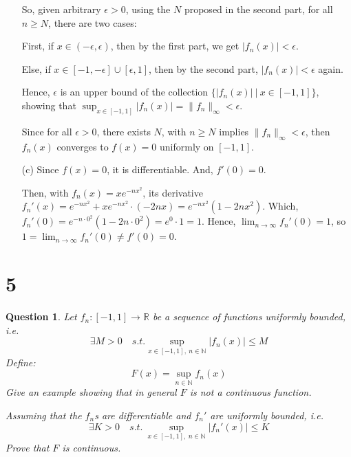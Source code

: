 \documentclass{article}
\newtheorem{question}{Question}
\begin{document}
\begin{itemize}
    \hfill

    So, given arbitrary $\epsilon>0$, using the $N$ proposed in the second part, for all $n\geq N$, there are two cases:

    First, if $x\in (-\epsilon,\epsilon)$, then by the first part, we get $|f_n(x)|<\epsilon$.

    Else, if $x\in [-1,-\epsilon]\cup[\epsilon,1]$, then by the second part, $|f_n(x)|<\epsilon$ again.

    Hence, $\epsilon$ is an upper bound of the collection $\{|f_n(x)|\ |\ x\in [-1,1]\}$, showing that $\sup_{x\in[-1,1]}|f_n(x)|=\|f_n\|_\infty<\epsilon$.

    Since for all $\epsilon>0$, there exists $N$, with $n\geq N$ implies $\|f_n\|_\infty<\epsilon$, then $f_n(x)$ converges to $f(x)=0$ uniformly on $[-1,1]$.
    
    \hfill

    \item[(c)] Since $f(x)=0$, it is differentiable. And, $f'(0)=0$.
    
    Then, with $f_n(x)=xe^{-nx^2}$, its derivative $f_n'(x)=e^{-nx^2}+xe^{-nx^2}\cdot(-2nx) = e^{-nx^2}(1-2nx^2)$.
    Which, $f_n'(0) = e^{-n\cdot 0^2}(1-2n\cdot 0^2) = e^0\cdot 1 = 1$. Hence, $\lim_{n\rightarrow\infty}f_n'(0)=1$, 
    so $1 = \lim_{n\rightarrow\infty}f_n'(0) \neq f'(0) = 0$.
\end{itemize}

\hfill

\hfill

\section*{5}
\begin{myBox}[]{}
    \begin{question}
        Let $f_n:[-1,1]\rightarrow\mathbb{R}$ be a sequence of functions uniformly bounded, i.e.
        $$\exists M>0\quad s.t. \sup_{x\in [-1,1],\ n\in\mathbb{N}}|f_n(x)| \leq M$$
        Define:
        $$F(x)=\sup_{n\in\mathbb{N}}f_n(x)$$
        Give an example showing that in general $F$ is not a continuous function. 
        
        Assuming that the $f_n$s are differentiable and $f_n'$ are uniformly bounded, i.e.
        $$\exists K>0\quad s.t.\ \sup_{x\in[-1,1],\ n\in\mathbb{N}}|f_n'(x)|\leq K$$
        Prove that $F$ is continuous.
    \end{question}
\end{myBox}
\end{document}
